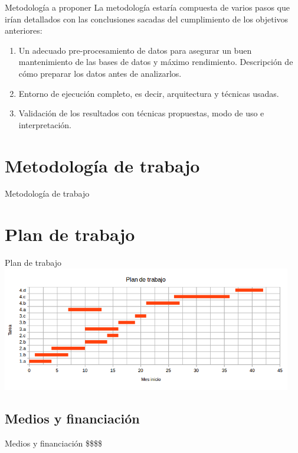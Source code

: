 \documentclass{beamer}
\begin{document}
\begin{frame}{Metodología a proponer}
La metodología estaría compuesta de varios pasos que irían detallados con las conclusiones sacadas del cumplimiento de los objetivos anteriores:

\begin{enumerate}
  \item Un adecuado pre-procesamiento de datos para asegurar un buen mantenimiento de las bases de datos y máximo rendimiento. Descripción de cómo preparar los datos antes de analizarlos.
  \item Entorno de ejecución completo, es decir, arquitectura y técnicas usadas.
  \item Validación de los resultados con técnicas propuestas, modo de uso e interpretación.
\end{enumerate}

\end{frame}

\section{Metodología de trabajo}

\begin{frame}{Metodología de trabajo}

\end{frame}

\section{Plan de trabajo}

\begin{frame}{Plan de trabajo}
\includegraphics[width=0.95\textwidth]{./imgs/especiedegantt.png}
\end{frame}

\subsection{Medios y financiación}

\begin{frame}{Medios y financiación}
\$\$\$\$
\end{frame}
\end{document}

